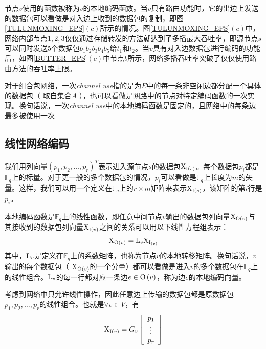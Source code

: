 \par
节点$v$使用的函数被称为$v$的本地编码函数。当$v$只有路由功能时，它的出边上发送的数据包可以看做是对入边上收到的数据包的复制，即图\ref{TULUNMOXING_EPS}$\left( c \right)$所示的情况。图\ref{TULUNMOXING_EPS}$\left(c\right)$中，网络内部节点$1,2,3$仅仅通过存储转发的方法就达到了多播最大吞吐率，即源节点$s$可以同时发送5个数据包$b_{1}b_{2}b_{3}b_{4}b_{5}$给$t_{1}$和$t_{2}$。当$v$具有对入边数据包进行编码的功能后，如图\ref{BUTTER_EPS}$\left(c\right)$中节点$b$所示，网络多播吞吐率突破了仅仅使用路由方法的吞吐率上限。
\par
对于组合包网络，一次\emph{channel use}指的是为$E$中的每一条非空闲边都分配一个具体的数据包（ 取自集合$A$ ），也可以看做是网路中的节点对特定编码函数的一次实现。换句话说，一次\emph{channel use}中的本地编码函数是固定的，且网络中的每条边最多被使用一次
\subsection{线性网络编码}\label{xianxingbianma}
我们用列向量$\left(p_{1},p_{2},\dots,p_{r}\right)^{T}$表示进入源节点$s$的数据包${{\rm X}_{{\rm I}\left( s \right)}}$。每个数据包$p_{i}$都是$\mathbb{F}_{q}$上的标量。对于更一般的多个数据包的情况，$p_{i}$可以看做是$\mathbb{F}_{q}$上长度为$m$的矢量。这样，我们可以用一个定义在$\mathbb{F}_{q}$上的$r \times m$矩阵来表示${\rm X}_{{\rm I}\left( s \right)}$，该矩阵的第$i$行是$p_{i}$。
\par
本地编码函数是$\mathbb{F}_{q}$上的线性函数，即任意中间节点$v$输出的数据包列向量${\rm X}_{{\rm O}\left( v \right)}$与其接收到的数据包列向量${\rm X}_{{\rm I}\left( v \right)}$之间的关系可以用以下线性方程组表示：
\begin{equation}\label{eq21}
{\rm X}_{{\rm O}\left( v \right)}={\rm L}_{v}{\rm X}_{{\rm I}_{\left( v \right)}}
\end{equation}
其中，${\rm L}_{v}$是定义在${\mathbb{F}}_{q}$上的系数矩阵，也称为节点$v$的本地转移矩阵。换句话说，$v$输出的每个数据包（ ${\rm X}_{{\rm O}\left( v \right)}$的一个分量）都可以看做是进入$v$的多个数据包在$\mathbb{F}_{q}$上的线性组合。${\rm L}_{v}$的每一行都对应一条边$e \in {\rm O}\left(v\right)$，称为边$e$的本地编码向量。
\par
考虑到网络中只允许线性操作，因此任意边上传输的数据包都是原数据包$p_{1},p_{2},\dots,p_{r}$的线性组合。也就是$\forall v \in V$，有
\begin{equation}\label{eq22}
{\rm X}_{{\rm I}\left( v \right)}=G_{v}\left[ {\begin{array}{*{20}{c}}
	{{p_1}}\\
	\vdots \\
	{{p_r}}
	\end{array}} \right]
\end{equation}
